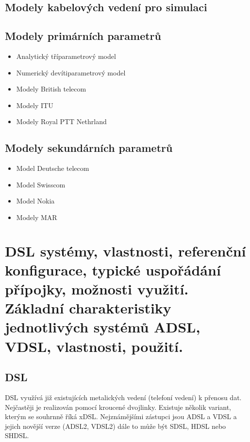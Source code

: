 \subsection{Modely kabelových vedení pro simulaci}

\subsection{Modely primárních parametrů}

\begin{itemize}
    \item Analytický tříparametrový model
    \item Numerický devítiparametrový model
    \item Modely British telecom
    \item Modely ITU
    \item Modely Royal PTT Nethrland
\end{itemize}

\subsection{Modely sekundárních parametrů}

\begin{itemize}
    \item Model Deutsche telecom
    \item Model Swisscom
    \item Model Nokia
    \item Modely MAR
\end{itemize}




\clearpage
\section{DSL systémy, vlastnosti, referenční konfigurace, typické uspořádání přípojky, možnosti využití. Základní charakteristiky jednotlivých systémů ADSL, VDSL, vlastnosti, použití.}

\subsection{DSL}

DSL využívá již existujících metalických vedení (telefoní vedení) k přenosu dat.
Nejčastěji je realizován pomocí kroucené dvojlinky.
Existuje několik variant, kterým se souhrnně říká xDSL.
Nejznámějšími zástupci jsou ADSL a VDSL a jejich novější verze (ADSL2, VDSL2) dále to může být SDSL, HDSL nebo SHDSL. 

